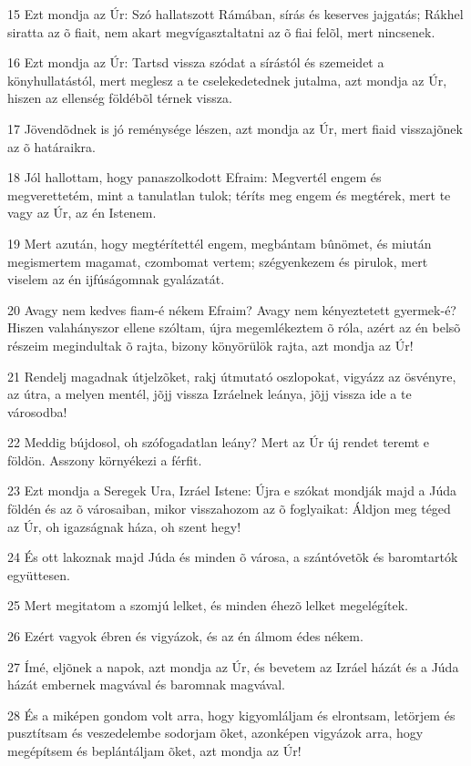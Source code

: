 \par 15 Ezt mondja az Úr: Szó hallatszott Rámában, sírás és keserves jajgatás; Rákhel siratta az õ fiait, nem akart megvígasztaltatni az õ fiai felõl, mert nincsenek.
\par 16 Ezt mondja az Úr: Tartsd vissza szódat a sírástól és szemeidet a könyhullatástól, mert meglesz a te cselekedetednek jutalma, azt mondja az Úr, hiszen az ellenség földébõl térnek vissza.
\par 17 Jövendõdnek is jó reménysége lészen, azt mondja az Úr, mert fiaid visszajõnek az õ határaikra.
\par 18 Jól hallottam, hogy panaszolkodott Efraim: Megvertél engem és megverettetém, mint a tanulatlan tulok; téríts meg engem és megtérek, mert te vagy az Úr, az én Istenem.
\par 19 Mert azután, hogy megtérítettél engem, megbántam bûnömet, és miután megismertem magamat, czombomat vertem; szégyenkezem és pirulok, mert viselem az én ijfúságomnak gyalázatát.
\par 20 Avagy nem kedves fiam-é nékem Efraim? Avagy nem kényeztetett gyermek-é? Hiszen valahányszor ellene szóltam, újra megemlékeztem õ róla, azért az én belsõ részeim megindultak õ rajta, bizony könyörülök rajta, azt mondja az Úr!
\par 21 Rendelj magadnak útjelzõket, rakj útmutató oszlopokat, vigyázz az ösvényre, az útra, a melyen mentél, jõjj vissza Izráelnek leánya, jõjj vissza ide a te városodba!
\par 22 Meddig bújdosol, oh szófogadatlan leány? Mert az Úr új rendet teremt e földön. Asszony  környékezi a férfit.
\par 23 Ezt mondja a Seregek Ura, Izráel Istene: Újra e szókat mondják majd a Júda földén és az õ városaiban, mikor visszahozom az õ foglyaikat: Áldjon meg téged az Úr, oh igazságnak háza, oh szent hegy!
\par 24 És ott lakoznak majd Júda és minden õ városa, a szántóvetõk és baromtartók együttesen.
\par 25 Mert megitatom a szomjú lelket, és minden éhezõ lelket megelégítek.
\par 26 Ezért vagyok ébren és vigyázok, és az én álmom édes nékem.
\par 27 Ímé, eljõnek a napok, azt mondja az Úr, és bevetem az Izráel házát és a Júda házát embernek magvával és baromnak magvával.
\par 28 És a miképen gondom volt arra, hogy kigyomláljam és elrontsam, letörjem és pusztítsam és veszedelembe sodorjam õket, azonképen vigyázok arra, hogy megépítsem és beplántáljam õket, azt mondja az Úr!
